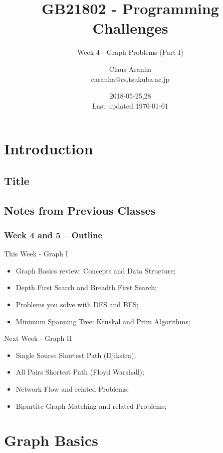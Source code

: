 \documentclass{beamer}
\title[GB21802]{GB21802 - Programming Challenges}
\subtitle[]{Week 4 - Graph Problems (Part I)}
\author[Claus Aranha]{Claus Aranha\\{\footnotesize caranha@cs.tsukuba.ac.jp}}
\institute{College of Information Science}
\date{2018-05-25,28\\{\tiny Last updated \today}}
\begin{document}
\section{Introduction}
\subsection{Title}
\begin{frame}
\maketitle
\end{frame}

\subsection{Notes from Previous Classes}



\begin{frame}
  \frametitle{Week 4 and 5 -- Outline}
  {\smaller
  \begin{block}{This Week - Graph I}
    \begin{itemize}
    \item Graph Basics review: Concepts and Data Structure;
    \item Depth First Search and Breadth First Search;
    \item Problems you solve with DFS and BFS;
    \item Minimum Spanning Tree: Kruskal and Prim Algorithms;
    \end{itemize}
  \end{block}
  \begin{block}{Next Week - Graph II}
    \begin{itemize}
    \item Single Sourse Shortest Path (Djikstra);
    \item All Pairs Shortest Path (Floyd Warshall);   
    \item Network Flow and related Problems;
    \item Bipartite Graph Matching and related Problems;
    \end{itemize}
  \end{block}}
\end{frame}

\section{Graph Basics}
\end{document}
